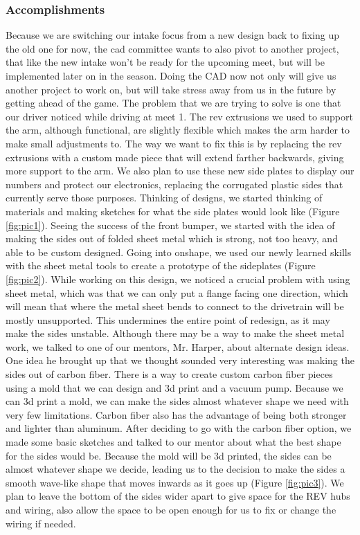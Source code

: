 \subsubsection*{Accomplishments}
Because we are switching our intake focus from a new design back to fixing up the old one for now, the cad committee wants to also pivot to another project, that like the new intake won’t be ready for the upcoming meet, but will be implemented later on in the season. Doing the CAD now not only will give us another project to work on, but will take stress away from us in the future by getting ahead of the game. The problem that we are trying to solve is one that our driver noticed while driving at meet 1. The rev extrusions we used to support the arm, although functional, are slightly flexible which makes the arm harder to make small adjustments to. The way we want to fix this is by replacing the rev extrusions with a custom made piece that will extend farther backwards, giving more support to the arm. We also plan to use these new side plates to display our numbers and protect our electronics, replacing the corrugated plastic sides that currently serve those purposes.
Thinking of designs, we started thinking of materials and making sketches for what the side plates would look like (Figure \ref{fig:pic1}). Seeing the success of the front bumper, we started with the idea of making the sides out of folded sheet metal which is strong, not too heavy, and able to be custom designed. Going into onshape, we used our newly learned skills with the sheet metal tools to create a prototype of the sideplates (Figure \ref{fig:pic2}). While working on this design, we noticed a crucial problem with using sheet metal, which was that we can only put a flange facing one direction, which will mean that where the metal sheet bends to connect to the drivetrain will be mostly unsupported. This undermines the entire point of redesign, as it may make the sides unstable. Although there may be a way to make the sheet metal work, we talked to one of our mentors, Mr. Harper, about alternate design ideas. One idea he brought up that we thought sounded very interesting was making the sides out of carbon fiber. There is a way to create custom carbon fiber pieces using a mold that we can design and 3d print and a vacuum pump. Because we can 3d print a mold, we can make the sides almost whatever shape we need with very few limitations. Carbon fiber also has the advantage of being both stronger and lighter than aluminum. 
After deciding to go with the carbon fiber option, we made some basic sketches and talked to our mentor about what the best shape for the sides would be. Because the mold will be 3d printed, the sides can be almost whatever shape we decide, leading us to the decision to make the sides a smooth wave-like shape that moves inwards as it goes up (Figure \ref{fig:pic3}). We plan to leave the bottom of the sides wider apart to give space for the REV hubs and wiring, also allow the space to be open enough for us to fix or change the wiring if needed. 

